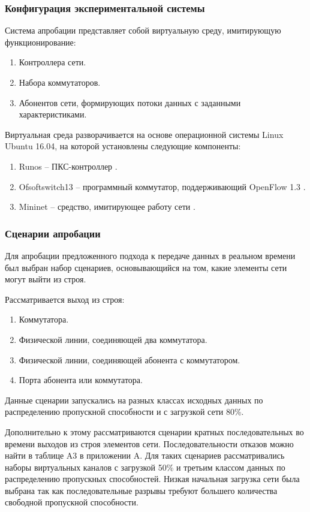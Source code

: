 \documentclass[12pt, a4paper]{article}
\begin{document}
\subsubsection{Конфигурация экспериментальной системы}
Система апробации представляет собой виртуальную среду, имитирующую
функционирование:
\begin{enumerate}
	\item Контроллера сети.
	\item Набора коммутаторов.
	\item Абонентов сети, формирующих потоки данных с заданными характеристиками.
\end{enumerate}

Виртуальная среда разворачивается на основе операционной системы Linux Ubuntu 16.04,
на которой установлены следующие компоненты:
\begin{enumerate}
	\item Runos -- ПКС-контроллер \cite{runos}.
	\item Ofsoftswitch13 -- программный коммутатор, поддерживающий OpenFlow 1.3 \cite{ofsoftswitch}.
	\item Mininet -- средство, имитирующее работу сети \cite{mininet}.
\end{enumerate}

\subsubsection{Сценарии апробации}

Для апробации предложенного подхода к передаче данных в реальном времени был выбран набор сценариев, основывающийся на том, какие элементы сети могут выйти из строя. 

Рассматривается выход из строя:
\begin{enumerate}
	\item Коммутатора.
	\item Физической линии, соединяющей два коммутатора.
	\item Физической линии, соединяющей абонента с коммутатором.
	\item Порта абонента или коммутатора.
\end{enumerate}

Данные сценарии запускались на разных классах исходных данных по распределению пропускной способности и с загрузкой сети 80\%. 

Дополнительно к этому рассматриваются сценарии кратных последовательных во времени выходов из строя элементов сети. Последовательности отказов можно найти в таблице A3 в приложении A. Для таких сценариев рассматривались наборы виртуальных каналов с загрузкой 50\% и третьим классом данных по распределению пропускных способностей. Низкая начальная загрузка сети была выбрана так как последовательные разрывы требуют большего количества свободной пропускной способности.
\end{document}
